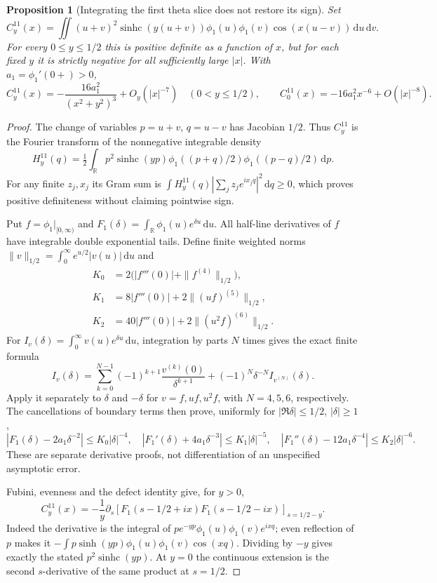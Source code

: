 \documentclass[11pt]{article}
\newtheorem{proposition}[theorem]{Proposition}
\theoremstyle{remark}\newtheorem{remark}[theorem]{Remark}
\newcommand{\R}{\mathbb R}
\newcommand{\dd}{\,\mathrm d}
\newcommand{\sinhc}{\operatorname{sinhc}}
\begin{document}
\begin{proposition}[Integrating the first theta slice does not restore its sign]
\label{prop:integrated-slice}
Set
\[
 C_y^{11}(x)=\iint (u+v)^2\sinhc(y(u+v))
                    \phi_1(u)\phi_1(v)\cos(x(u-v))\dd u\dd v.
\]
For every $0\le y\le1/2$ this is positive definite as a function
of $x$, but for each fixed $y$ it is strictly negative for
all sufficiently large $|x|$. With $a_1=\phi_1'(0+)>0$,
\[
 C_y^{11}(x)=-\frac{16a_1^2}{(x^2+y^2)^3}
                       +O_y(|x|^{-7})\quad(0<y\le1/2),
 \qquad
 C_0^{11}(x)=-16a_1^2x^{-6}+O(|x|^{-8}).
\]
\end{proposition}
\begin{proof}
The change of variables $p=u+v$, $q=u-v$ has Jacobian $1/2$.
Thus $C_y^{11}$ is the Fourier transform of the nonnegative
integrable density
\[
 H_y^{11}(q)=\tfrac12\int_\R p^2\sinhc(yp)
                  \phi_1((p+q)/2)\phi_1((p-q)/2)\dd p.
\]
For any finite $z_j,x_j$ its Gram sum is
$\int H_y^{11}(q)|\sum_jz_je^{ix_jq}|^2\dd q\ge0$,
which proves positive definiteness without claiming pointwise sign.

Put $f=\phi_1|_{[0,\infty)}$ and
$F_1(\delta)=\int_\R\phi_1(u)e^{\delta u}\dd u$.
All half-line derivatives of $f$ have integrable
double exponential tails. Define finite weighted norms
$\|v\|_{1/2}=\int_0^\infty e^{u/2}|v(u)|\dd u$ and
\[
 \begin{split}
 K_0&=2\bigl(|f'''(0)|+\|f^{(4)}\|_{1/2}\bigr),\\
 K_1&=8|f'''(0)|+2\|(uf)^{(5)}\|_{1/2},\\
 K_2&=40|f'''(0)|+2\|(u^2f)^{(6)}\|_{1/2}.
 \end{split}
\]
For $I_v(\delta)=\int_0^\infty v(u)e^{\delta u}\dd u$,
integration by parts $N$ times gives the exact finite formula
\[
 I_v(\delta)=\sum_{k=0}^{N-1}
      (-1)^{k+1}\frac{v^{(k)}(0)}{\delta^{k+1}}
             +(-1)^N\delta^{-N}I_{v^{(N)}}(\delta).
\]
Apply it separately to $\delta$ and $-\delta$ for $v=f,uf,u^2f$,
with $N=4,5,6$, respectively. The cancellations of boundary
terms then prove, uniformly for $|\Re\delta|\le1/2$, $|\delta|\ge1$,
\[
 \left|F_1(\delta)-2a_1\delta^{-2}\right|\le K_0|\delta|^{-4},
 \quad
 \left|F_1'(\delta)+4a_1\delta^{-3}\right|\le K_1|\delta|^{-5},
 \quad
 \left|F_1''(\delta)-12a_1\delta^{-4}\right|\le K_2|\delta|^{-6}.
\]
These are separate derivative proofs, not differentiation of an
unspecified asymptotic error.

Fubini, evenness and the defect identity give, for $y>0$,
\[
 C_y^{11}(x)=-\frac1y\partial_s
   [F_1(s-1/2+ix)F_1(s-1/2-ix)]_{s=1/2-y}.
\]
Indeed the derivative is the integral of
$p e^{-yp}\phi_1(u)\phi_1(v)e^{ixq}$;
even reflection of $p$ makes it
$-\int p\sinh(yp)\phi_1(u)\phi_1(v)\cos(xq)$.
Dividing by $-y$ gives exactly the stated $p^2\sinhc(yp)$.
At $y=0$ the continuous extension is the second $s$-derivative
of the same product at $s=1/2$.


\end{proof}
\end{document}
